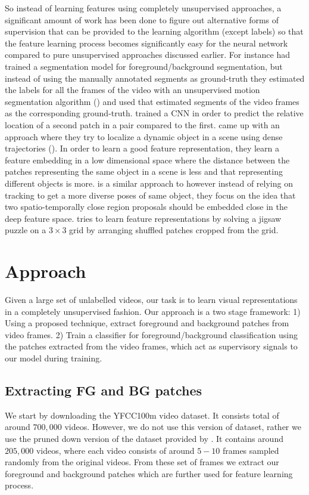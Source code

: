 \documentclass[10pt,twocolumn,letterpaper]{article}
\begin{document}
So instead of learning features using completely unsupervised approaches, a significant amount of work has been done to figure out alternative forms of supervision that can be provided to the learning algorithm (except labels) so that the feature learning process becomes significantly easy for the neural network compared to pure unsupervised approaches discussed earlier. For instance \cite{pathak2017learning} had trained a segmentation model for foreground/background segmentation, but instead of using the manually annotated segments as ground-truth they estimated the labels for all the frames of the video with an unsupervised motion segmentation algorithm  (\cite{faktor2014video}) and used that estimated segments of the video frames as the corresponding ground-truth. \cite{doersch2015unsupervised} trained a CNN in order to predict the relative location of a second patch in a pair compared to the first. \cite{wang2015unsupervised} came up with an approach where they try to localize a dynamic object in a scene using dense trajectories (\cite{wang2013action}). In order to learn a good feature representation, they learn a feature embedding in a low dimensional space where the distance between the patches representing the same object in a scene is less and that representing different objects is more. \cite{gao2016object} is a similar approach to \cite{wang2015unsupervised} however instead of relying on tracking to get a more diverse poses of same object, they focus on the idea that two spatio-temporally close region proposals should be embedded close in the deep feature space. \cite{noroozi2016unsupervised} tries to learn feature representations by solving a jigsaw puzzle on a $3\times3$ grid by arranging shuffled patches cropped from the grid.

\section{Approach}

Given a large set of unlabelled videos, our task is to learn visual representations in a completely unsupervised fashion. Our approach is a two stage framework: 1) Using a proposed technique, extract foreground and background patches from video frames. 2) Train a classifier for foreground/background classification using the patches extracted from the video frames, which act as supervisory signals to our model during training.

\subsection{Extracting FG and BG patches}
We start by downloading the YFCC100m \cite{thomee2016yfcc100m} video dataset. It consists total of around $700,000$ videos. However, we do not use this version of dataset, rather we use the pruned down version of the dataset provided by \cite{pathak2017learning}. It contains around $205,000$ videos, where each video consists of around $5-10$ frames sampled randomly from the original videos. From these set of frames we extract our foreground and background patches which are further used for feature learning process. 
\end{document}
